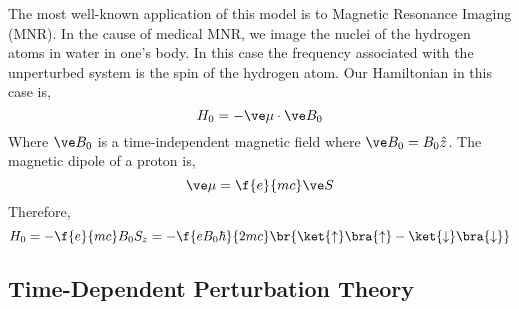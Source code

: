 \documentclass{article}
\begin{document}
The most well-known application of this model is to Magnetic Resonance Imaging (MNR). In the cause of medical MNR, we image the nuclei of the hydrogen atoms in water in one's body. In this case the frequency associated with the unperturbed system is the spin of the hydrogen atom. Our Hamiltonian in this case is,
\[ H_0 = - \ve \mu \cdot \ve B_0 \]
Where $\ve B_0$ is a time-independent magnetic field where $\ve B_0 = B_0 \hat z$. The magnetic dipole of a proton is,
\[ \ve \mu = \f{e}{mc} \ve S \]
Therefore,
\[ H_0 = -\f{e}{mc} B_0 S_z = -\f{e B_0 \hbar}{2mc} \br{\ket{\uparrow} \bra{\uparrow} - \ket{\downarrow} \bra{\downarrow}}\]


\subsection{Time-Dependent Perturbation Theory}
\end{document}
